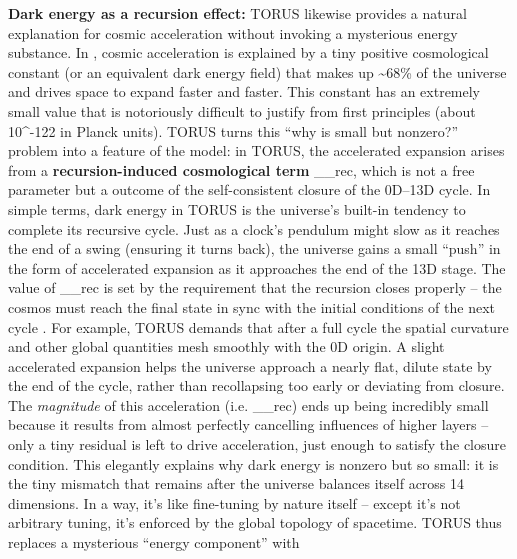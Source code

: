 \documentclass[
]{article}
\begin{document}
{\textbf{Dark energy as a recursion effect:} TORUS likewise provides a
natural explanation for cosmic acceleration without invoking a
mysterious energy substance. In \LambdaCDM, cosmic acceleration is explained
by a tiny positive cosmological constant \Lambda (or an equivalent dark energy
field) that makes up \textasciitilde68\% of the universe and drives
space to expand faster and faster. This constant \Lambda has an extremely
small value that is notoriously difficult to justify from first
principles (about 10\^{}-122 in Planck units)\hspace{0pt}. TORUS turns
this ``why is \Lambda small but nonzero?'' problem into a feature of the
model: in TORUS, the accelerated expansion arises from a
\textbf{recursion-induced cosmological term}
\Lambda\__{rec}, which is not
a free parameter but a outcome of the self-consistent closure of the
0D--13D cycle\hspace{0pt}. In simple terms, dark energy in TORUS is the
universe's built-in tendency to complete its recursive cycle. Just as a
clock's pendulum might slow as it reaches the end of a swing (ensuring
it turns back), the universe gains a small ``push'' in the form of
accelerated expansion as it approaches the end of the 13D stage. The
value of \Lambda\__{rec}{} is
set by the requirement that the recursion closes properly -- the cosmos
must reach the final state in sync with the initial conditions of the
next cycle\hspace{0pt} \hspace{0pt}. For example, TORUS demands that
after a full cycle the spatial curvature and other global quantities
mesh smoothly with the 0D origin. A slight accelerated expansion helps
the universe approach a nearly flat, dilute state by the end of the
cycle, rather than recollapsing too early or deviating from
closure\hspace{0pt}. The \emph{magnitude} of this acceleration (i.e.
\Lambda\__{rec}) ends up being
incredibly small because it results from almost perfectly cancelling
influences of higher layers -- only a tiny residual is left to drive
acceleration, just enough to satisfy the closure condition\hspace{0pt}.
This elegantly explains why dark energy is nonzero but so small: it is
the tiny mismatch that remains after the universe balances itself across
14 dimensions. In a way, it's like fine-tuning by nature itself --
except it's not arbitrary tuning, it's enforced by the global topology
of spacetime. TORUS thus replaces a mysterious ``energy component'' with
}
\end{document}
